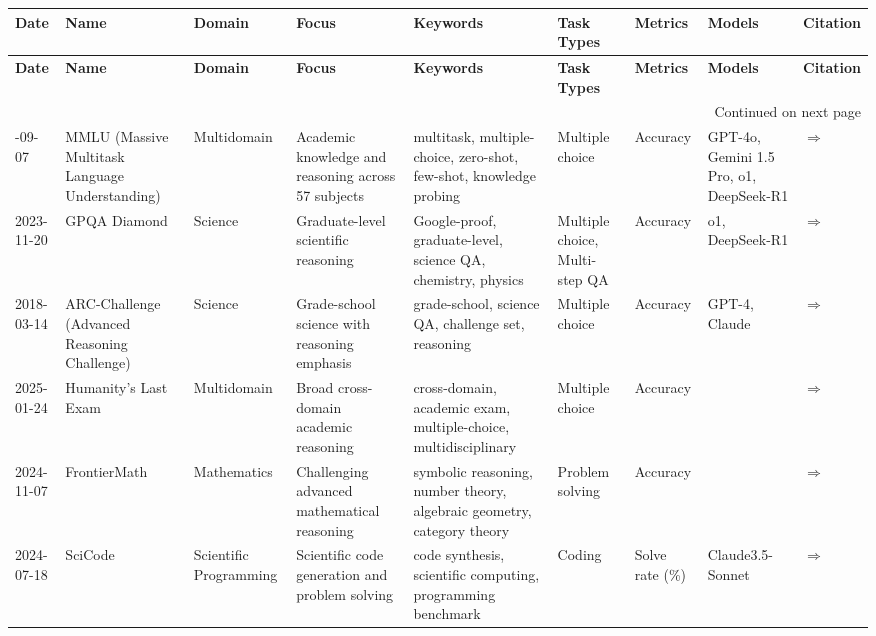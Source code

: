 \documentclass{article}
\begin{document}
\begin{landscape}\footnotesize
\begin{longtable}{|p{2cm}|p{2cm}|p{2cm}|p{2cm}|p{2cm}|p{2cm}|p{2cm}|p{2cm}|p{2cm}|}
\hline
\textbf{Date} & \textbf{Name} & \textbf{Domain} & \textbf{Focus} & \textbf{Keywords} & \textbf{Task Types} & \textbf{Metrics} & \textbf{Models} & \textbf{Citation} \\ \hline
\endfirsthead
\hline
\textbf{Date} & \textbf{Name} & \textbf{Domain} & \textbf{Focus} & \textbf{Keywords} & \textbf{Task Types} & \textbf{Metrics} & \textbf{Models} & \textbf{Citation} \\ \hline
\endhead
\hline
\multicolumn{9}{r}{Continued on next page} \\
\endfoot
\hline
\endlastfoot
2020-09-07 & MMLU (Massive Multitask Language Understanding) & Multidomain & Academic knowledge and reasoning across 57 subjects & multitask, multiple-choice, zero-shot, few-shot, knowledge probing & Multiple choice & Accuracy & GPT-4o, Gemini 1.5 Pro, o1, DeepSeek-R1 & \cite{hendrycks2021measuring}\href{https://paperswithcode.com/dataset/mmlu}{$\Rightarrow$} \\ \hline
2023-11-20 & GPQA Diamond & Science & Graduate-level scientific reasoning & Google-proof, graduate-level, science QA, chemistry, physics & Multiple choice, Multi-step QA & Accuracy & o1, DeepSeek-R1 & \cite{rein2023gpqagraduatelevelgoogleproofqa}\href{https://arxiv.org/abs/2311.12022}{$\Rightarrow$} \\ \hline
2018-03-14 & ARC-Challenge (Advanced Reasoning Challenge) & Science & Grade-school science with reasoning emphasis & grade-school, science QA, challenge set, reasoning & Multiple choice & Accuracy & GPT-4, Claude & \cite{clark2018think}\href{https://allenai.org/data/arc}{$\Rightarrow$} \\ \hline
2025-01-24 & Humanity's Last Exam & Multidomain & Broad cross-domain academic reasoning & cross-domain, academic exam, multiple-choice, multidisciplinary & Multiple choice & Accuracy &  & \cite{phan2025humanitys}\href{https://arxiv.org/abs/2501.14249}{$\Rightarrow$} \\ \hline
2024-11-07 & FrontierMath & Mathematics & Challenging advanced mathematical reasoning & symbolic reasoning, number theory, algebraic geometry, category theory & Problem solving & Accuracy &  & \cite{glazer2024frontiermath}\href{https://arxiv.org/abs/2411.04872}{$\Rightarrow$} \\ \hline
2024-07-18 & SciCode & Scientific Programming & Scientific code generation and problem solving & code synthesis, scientific computing, programming benchmark & Coding & Solve rate (\%) & Claude3.5-Sonnet & \cite{tian2024scicode}\href{https://arxiv.org/abs/2407.13168}{$\Rightarrow$} \\ \hline

\end{longtable}
\end{landscape}
\end{document}
